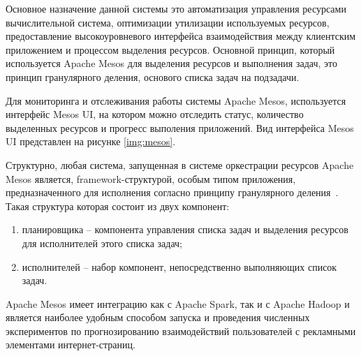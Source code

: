 Основное назначение данной системы это автоматизация управления ресурсами вычислительной система, оптимизации
утилизации используемых ресурсов, предоставление высокоуровневого интерфейса взаимодействия между клиентским
приложением и процессом выделения ресурсов. Основной принцип, который используется Apache Mesos для выделения ресурсов и выполнения задач, это принцип
гранулярного деления, основого списка задач на подзадачи.

Для мониторинга и отслеживания работы системы Apache Mesos, используется интерфейс Mesos UI,
на котором можно отследить статус, количество выделенных ресурсов и прогресс выполения приложений.
Вид интерфейса Mesos UI представлен на рисунке \ref{img:mesos}.


Структурно, любая система, запущенная в системе оркестрации ресурсов Apache Mesos является, 
framework-структурой, особым типом приложения, предназначенного для исполнения
согласно принципу гранулярного деления~\autocite{impl:mesos}. Такая структура которая состоит из двух компонент:
\begin{enumerate}
    \item планировщика -- компонента управления списка задач и выделения ресурсов для исполнителей этого списка задач;
    \item исполнителей -- набор компонент, непосредственно выполняющих список задач.
\end{enumerate}  

Apache Mesos имеет интеграцию как с Apache Spark, так и с Apache Hadoop и является наиболее удобным
способом запуска и проведения численных экспериментов по прогнозированию взаимодействий пользователей
с рекламными элементами интернет-страниц.
